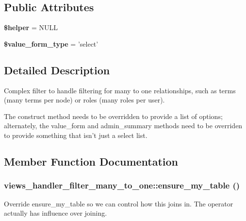 \subsection*{Public Attributes}
\begin{DoxyCompactItemize}
\item 
\hypertarget{classviews__handler__filter__many__to__one_a76b87430a6463439035ff91b35306132}{
{\bfseries \$helper} = NULL}
\label{classviews__handler__filter__many__to__one_a76b87430a6463439035ff91b35306132}

\item 
\hypertarget{classviews__handler__filter__many__to__one_aa31ab009988ec4f015588b3dcf8c3b92}{
{\bfseries \$value\_\-form\_\-type} = 'select'}
\label{classviews__handler__filter__many__to__one_aa31ab009988ec4f015588b3dcf8c3b92}

\end{DoxyCompactItemize}


\subsection{Detailed Description}
Complex filter to handle filtering for many to one relationships, such as terms (many terms per node) or roles (many roles per user).

The construct method needs to be overridden to provide a list of options; alternately, the value\_\-form and admin\_\-summary methods need to be overriden to provide something that isn't just a select list. 

\subsection{Member Function Documentation}
\hypertarget{classviews__handler__filter__many__to__one_a6ab5d3416cca7a6f5e59584071758673}{
\subsubsection[{ensure\_\-my\_\-table}]{\setlength{\rightskip}{0pt plus 5cm}views\_\-handler\_\-filter\_\-many\_\-to\_\-one::ensure\_\-my\_\-table ()}}
\label{classviews__handler__filter__many__to__one_a6ab5d3416cca7a6f5e59584071758673}
Override ensure\_\-my\_\-table so we can control how this joins in. The operator actually has influence over joining. 

